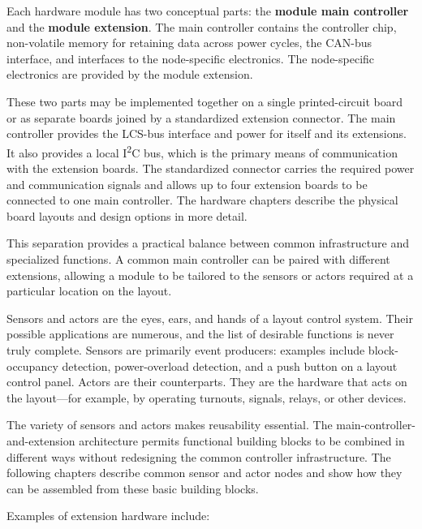 Each hardware module has two conceptual parts: the \textbf{module main controller} and the \textbf{module extension}. The main controller contains the controller chip, non-volatile memory for retaining data across power cycles, the CAN-bus interface, and interfaces to the node-specific electronics. The node-specific electronics are provided by the module extension.

These two parts may be implemented together on a single printed-circuit board or as separate boards joined by a standardized extension connector. The main controller provides the LCS-bus interface and power for itself and its extensions. It also provides a local I\textsuperscript{2}C bus, which is the primary means of communication with the extension boards. The standardized connector carries the required power and communication signals and allows up to four extension boards to be connected to one main controller. The hardware chapters describe the physical board layouts and design options in more detail.

This separation provides a practical balance between common infrastructure and specialized functions. A common main controller can be paired with different extensions, allowing a module to be tailored to the sensors or actors required at a particular location on the layout.


Sensors and actors are the eyes, ears, and hands of a layout control system. Their possible applications are numerous, and the list of desirable functions is never truly complete. Sensors are primarily event producers: examples include block-occupancy detection, power-overload detection, and a push button on a layout control panel. Actors are their counterparts. They are the hardware that acts on the layout---for example, by operating turnouts, signals, relays, or other devices.

The variety of sensors and actors makes reusability essential. The main-controller-and-extension architecture permits functional building blocks to be combined in different ways without redesigning the common controller infrastructure. The following chapters describe common sensor and actor nodes and show how they can be assembled from these basic building blocks.

Examples of extension hardware include:

